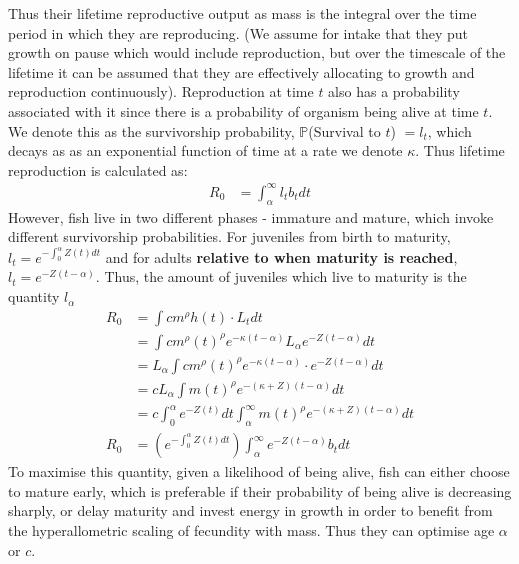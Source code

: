 \documentclass[a4paper]{article} %
\begin{document}
Thus their lifetime reproductive output as mass is the integral over the time period in which they are reproducing. (We assume for intake that they put growth on pause which would include reproduction, but over the timescale of the lifetime it can be assumed that they are effectively allocating to growth and reproduction continuously). 
Reproduction at time $t$ also has a probability associated with it since there is a probability of organism being alive at time $t$. We denote this as the survivorship probability, $\mathbb{P}$(Survival to $t$) $= l_{t}$, which decays as as an exponential function of time at a rate we denote $\kappa$. Thus lifetime reproduction is calculated as:
\begin{align}
    R_{0} &= \int_{\alpha}^{\infty}l_{t}b_{t} dt
\end{align}
However, fish live in two different phases - immature and mature, which invoke different survivorship probabilities. For juveniles from birth to maturity, $l_t = e^{-\int_{0}^{\alpha}Z(t)dt}$ and for adults \textbf{relative to when maturity is reached}, $l_{t} = e^{-Z(t-\alpha)}$. Thus, the amount of juveniles which live to maturity is the quantity $l_{\alpha}$
\begin{align*}
    R_{0} &= \int cm^{\rho}h(t) \cdot L_{t} dt \\
          &= \int cm^{\rho}(t)^{\rho} e^{-\kappa(t-\alpha)} L_{\alpha}e^{-Z(t-\alpha)} dt \\
          &= L_{\alpha}\int cm^{\rho}(t)^{\rho} e^{-\kappa(t-\alpha)} \cdot e^{-Z(t-\alpha)} dt \\
          &= cL_{\alpha}\int m(t)^{\rho} e^{-(\kappa+Z)(t-\alpha)} dt \\
          &= c\int_{0}^{\alpha}e^{-Z(t)}dt\int_{\alpha}^{\infty} m(t)^{\rho} e^{-(\kappa+Z)(t-\alpha)} dt \\
    R_{0} &= (e^{-\int_{0}^{\alpha}Z(t)dt})\int_{\alpha}^{\infty}e^{-Z(t-\alpha)}b_{t} dt
\end{align*}
To maximise this quantity, given a likelihood of being alive, fish can either choose to mature early, which is preferable if their probability of being alive is decreasing sharply, or delay maturity and invest energy in growth in order to benefit from the hyperallometric scaling of fecundity with mass. Thus they can optimise age $\alpha$ or $c$.
\end{document}

